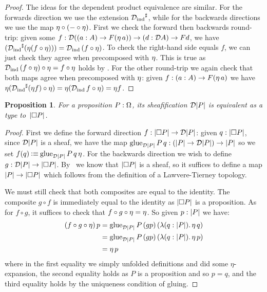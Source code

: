 \documentclass[11pt]{article}
\newtheorem{prop}[thrm]{Proposition}
\begin{document}
\begin{proof}
  The ideas for the dependent product equivalence are similar.
  For the forwards direction we use the extension \({\mathcal{D}_\text{ind}}^\sharp\),
  while for the backwards directions we use the map
  \(\eta \circ (-\circ\eta)\).
  First we check the forward then backwards round-trip: given some
  \(f : \mathcal{D}{({{(a:A)}\to{F(\eta\,{a})}})}\to{{(d:\mathcal{D}{A})}\to{Fd}}\),
  we have
  \(
    ({\mathcal{D}_\text{ind}}^\sharp(\eta (f\circ\eta)))
    =
    \mathcal{D}_\text{ind}\,{(f\circ\eta)}
  \).
  To check the right-hand side equals \(f\), we can just check they agree
  when precomposed with \(\eta\).
  This is true as
  \(\mathcal{D}_\text{ind}\,{(f\circ\eta)}\circ\eta = f\circ\eta\)
  holds by .
  For the other round-trip we again check that both maps
  agree when precomposed with \(\eta\): given
  \(f : {{(a:A)}\to{F(\eta\,{a})}}\) we have
  \(
    \eta{({\mathcal{D}_\text{ind}}^\sharp(\eta{f})\circ\eta)}
    =
    \eta{(\mathcal{D}_\text{ind}\,{f}\circ\eta)}
    =
    \eta{f}
   \).
\end{proof}

\begin{prop}
  For a proposition \(P : \Omega\), its sheafification \(\mathcal{D}{|{P}|}\)
  is equivalent as a type to~\(|{\Box{P}}|\).
\end{prop}
\begin{proof}
  First we define the forward direction
  \(f : |{\Box{P}}| \to \mathcal{D}{|{P}|}\):
  given \(q : |{\Box{P}}|\), since \(\mathcal{D}{|{P}|}\) is a sheaf,
  we have the map
  \(\text{glue}_{\mathcal{D}{|{P}|}}\,P\,q : (|{P}| \to \mathcal{D}{|{P}|}) \to |{P}|\)
  so we set
  \(f(q) \mathbin{\vcentcolon\equiv} \text{glue}_{\mathcal{D}{|{P}|}}\,P\,q\,\eta\).
  For the backwards direction we wish to define
  \(g : \mathcal{D}{|{P}|} \to |{\Box{P}}|\).
  By~ we know that \(|{\Box{P}}|\)
  is a sheaf, so it suffices to define a map
  \(|{P}| \to |{\Box{P}}|\) which follows from the
  definition of a Lawvere-Tierney topology.

  We must still check that both composites are equal to the identity.
  The composite \(g\circ f\) is immediately equal to the identity as
  \(|{\Box{P}}|\) is a proposition.
  As for \(f \circ g\), it suffices to check that
  \(f\circ g\circ \eta = \eta\).
  So given \(p : |{P}|\) we have:
  \begin{align*}
    (f \circ g \circ \eta)\,p
    &=
      \text{glue}_{\mathcal{D}{|{P}|}}\,P\,(gp)\,({\mathop{\lambda({q:|{P}|}).}{\eta\,{q}}})
    \\
    &=
      \text{glue}_{\mathcal{D}{|{P}|}}\,P\,(gp)\,({\mathop{\lambda({q:|{P}|}).}{\eta\,{p}}})
    \\
    &=
      \eta\,{p}
  \end{align*}
  where in the first equality we simply unfolded definitions and did some
  \(\eta\)-expansion, the second equality holds as \(P\) is a proposition and so
  \(p = q\), and the third equality holds by the uniqueness condition of gluing.
\end{proof}
\end{document}
